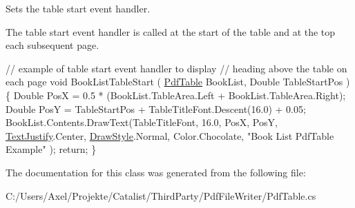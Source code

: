 Sets the table start event handler. 

The table start event handler is called at the start of the table and at the top each subsequent page. 
\begin{DoxyCode}
\textcolor{comment}{// example of table start event handler to display}
\textcolor{comment}{// heading above the table on each page}
\textcolor{keywordtype}{void} BookListTableStart
    (
    \hyperlink{class_pdf_file_writer_1_1_pdf_table_a088d3d729902c78097bd8505ddd5ec23}{PdfTable}    BookList,
    Double      TableStartPos
    )
\{
Double PosX = 0.5 * (BookList.TableArea.Left + BookList.TableArea.Right);
Double PosY = TableStartPos + TableTitleFont.Descent(16.0) + 0.05;
BookList.Contents.DrawText(TableTitleFont, 16.0, PosX, PosY,
    \hyperlink{namespace_pdf_file_writer_a3991bfacc8c7be240452dd24ec817157}{TextJustify}.Center, \hyperlink{namespace_pdf_file_writer_a2bcdd73c6cedab15d6f6c2a64333ef39}{DrawStyle}.Normal, Color.Chocolate, \textcolor{stringliteral}{"Book List PdfTable Example"}
      ); 
\textcolor{keywordflow}{return};
\}
\end{DoxyCode}
 

The documentation for this class was generated from the following file\+:\begin{DoxyCompactItemize}
\item 
C\+:/\+Users/\+Axel/\+Projekte/\+Catalist/\+Third\+Party/\+Pdf\+File\+Writer/Pdf\+Table.\+cs\end{DoxyCompactItemize}
